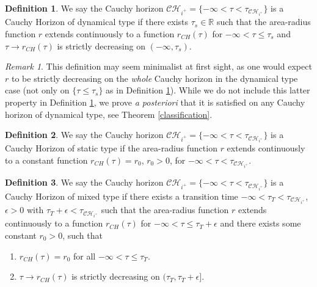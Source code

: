 \documentclass[10pt,a4paper]{article}
\theoremstyle{plain}
\theoremstyle{remark}
\newtheorem{rmk}{Remark}[section]
\theoremstyle{definition}
\newtheorem{defn}{Definition}[section]
\newcommand{\RR}{\mathbb{R}}
\theoremstyle{plain}
\theoremstyle{remark}
\theoremstyle{definition}
\newcommand{\CH}{\mathcal{CH}_{i^+}}
\numberwithin{equation}{section}
\begin{document}
\begin{defn} \label{dynamicaldef}
	We say the Cauchy horizon $\CH = \{ -\infty < \tau < \tau_{\CH}\}$ is a Cauchy Horizon of dynamical type  if there exists $\tau_s \in \RR$ such that the area-radius function $r$ extends continuously to a function $r_{CH}(\tau)$ for $-\infty< \tau \leq \tau_s$ and $\tau \rightarrow r_{CH}(\tau)$ is strictly decreasing on $(-\infty,\tau_s)$.
	
	
\end{defn} 
\begin{rmk}
This definition may seem minimalist at first sight, as one would expect $r$ to be strictly decreasing on the \textit{whole} Cauchy horizon in the dynamical type case (not only on $\{\tau \leq\tau_s\}$ as in Definition \ref{dynamicaldef}). While we do not include this latter property in Definition \ref{dynamicaldef}, we prove \textit{a posteriori} that it is satisfied on any Cauchy horizon of dynamical type, see Theorem \ref{classification}. 
\end{rmk} \color{black}
\begin{defn}  \label{rigiddef}
	We say the Cauchy horizon $\CH = \{ -\infty < \tau < \tau_{\CH}\}$ is a Cauchy Horizon of static type if the area-radius function $r$ extends continuously to a constant function $r_{CH}(\tau) = r_0$, $r_0 >0$,  for $-\infty< \tau < \tau_{\CH} $.
\end{defn}

\begin{defn}  \label{mixeddef}
	We say the Cauchy horizon $\CH = \{ -\infty < \tau < \tau_{\CH}\}$ is a Cauchy Horizon of mixed type if there exists a transition time $-\infty < \tau_T <\tau_{\CH}$, $\epsilon>0$ with $\tau_T+\epsilon < \tau_{\CH}$ such that the area-radius function $r$ extends continuously to a function $r_{CH}(\tau)$ for $-\infty< \tau \leq \tau_{T}+\epsilon $ and there exists some constant $r_0 >0$, such that \begin{enumerate}
		\item $r_{CH}(\tau)= r_0$ for all $-\infty< \tau \leq \tau_{T} $.
		\item $\tau \rightarrow r_{CH}(\tau)$ is strictly decreasing on $(\tau_T,\tau_{T}+\epsilon]$.
	\end{enumerate}
\end{defn}
\end{document}
